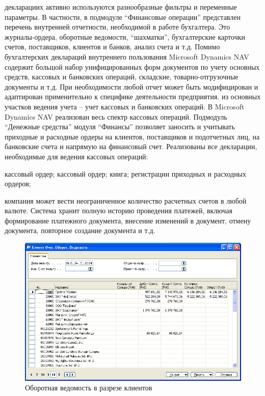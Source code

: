\documentclass[14pt,a4paper]{reportmod}
\begin{document}
 декларациих активно используются разнообразные фильтры и переменные параметры. В частности, в подмодуле ``Финансовые операции'' представлен перечень внутренней отчетности, необходимой в работе бухгалтера. Это журналы-ордера, оборотные ведомости, ``шахматки'', бухгалтерские карточки счетов, поставщиков, клиентов и банков, анализ счета и т.д. Помимо бухгалтерских деклараций внутреннего пользования Microsoft Dynamics NAV содержит большой набор унифицированных форм документов по учету основных средств, кассовых и банковских операций, складские, товарно-отгрузочные документы и т.д. При необходимости любой отчет может быть модифицирован и адаптирован применительно к специфике деятельности предприятия.
 из основных участков ведения учета – учет кассовых и банковских операций. В Microsoft Dynamics NAV реализован весь спектр кассовых операций. Подмодуль ``Денежные средства'' модуля ``Финансы'' позволяет заносить и учитывать приходные и расходные ордеры на клиентов, поставщиков и подотчетных лиц, на банковские счета и напрямую на финансовый счет. Реализованы все декларации, необходимые для ведения кассовых операций:
\begin{itemize}
   кассовый ордер;
   кассовый ордер;
   книга;
   регистрации приходных и расходных ордеров;
\end{itemize}
 компания может вести неограниченное количество расчетных счетов в любой валюте. Система хранит полную историю проведения платежей, включая формирование платежного документа, внесение изменений в документ, отмену документа, повторное создание документа и т.д.
\begin{figure}
  \centering
  \includegraphics[scale=0.50]{pics/navision_img1}
  \caption{Оборотная ведомость в разрезе клиентов}
  \label{pic:navision_pic1}
\end{figure}
\end{document}
